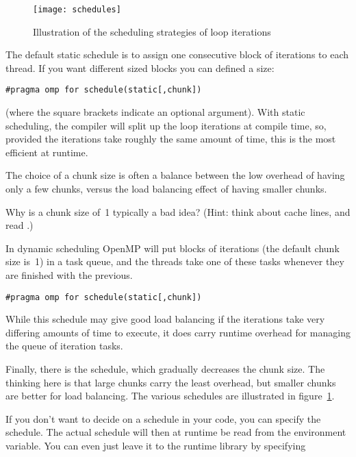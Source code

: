 \begin{figure}[ht]
  \texttt{[image: schedules]}
  \caption{Illustration of the scheduling strategies of loop iterations}
  \label{fig:omp-schedule}
\end{figure}

The default static schedule is to assign one consecutive block of
iterations to each thread. If you want different sized blocks you can
defined a  size:
\begin{verbatim}
#pragma omp for schedule(static[,chunk])
\end{verbatim}
(where the square brackets indicate an optional argument).
With static scheduling, the compiler will split up the loop iterations at compile time,
so, provided the iterations take roughly the same amount of time, this is the most efficient at runtime.

The choice of a chunk size is often a balance between the low overhead of having 
only a few chunks, versus the load balancing effect of having smaller chunks.
\begin{exercise}
  Why is a chunk size of~1 typically a bad idea? (Hint: think about
  cache lines, and read .)
\end{exercise}

In dynamic scheduling OpenMP will put blocks of iterations
(the default chunk size is~1) in a task queue, and the threads take one of these
tasks whenever they are finished with the previous.
\begin{verbatim}
#pragma omp for schedule(static[,chunk])
\end{verbatim}
While this schedule may give good load balancing if the iterations
take very differing amounts of time to execute, it does carry runtime
overhead for managing the queue of iteration tasks.

Finally, there is the  schedule, which gradually decreases the chunk size.
The thinking here is that large chunks carry the least overhead, but smaller chunks are better
for load balancing.
%
The various schedules are illustrated in figure~\ref{fig:omp-schedule}.

If you don't want to decide on a schedule in your code, you can
specify the  schedule. The actual
schedule will then at runtime be read from the
 environment variable. You can even just
leave it to the runtime library by specifying

